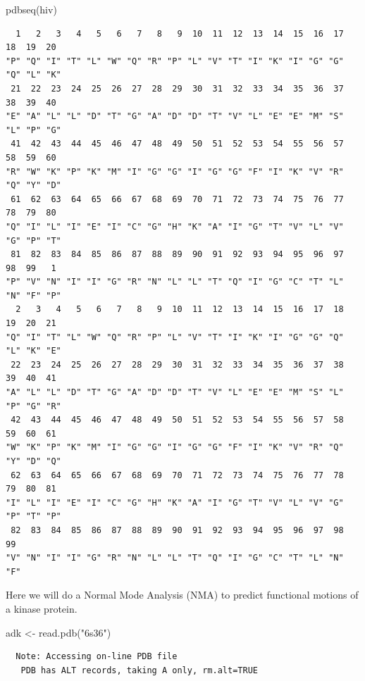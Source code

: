 \documentclass[
  letterpaper,
  DIV=11,
  numbers=noendperiod]{scrartcl}
\newenvironment{Shaded}{\begin{snugshade}}{\end{snugshade}}
\newcommand{\FunctionTok}[1]{\textcolor[rgb]{0.28,0.35,0.67}{#1}}
\newcommand{\NormalTok}[1]{\textcolor[rgb]{0.00,0.23,0.31}{#1}}
\newcommand{\OtherTok}[1]{\textcolor[rgb]{0.00,0.23,0.31}{#1}}
\newcommand{\StringTok}[1]{\textcolor[rgb]{0.13,0.47,0.30}{#1}}
\begin{document}
\begin{Shaded}
\begin{Highlighting}[]
\FunctionTok{pdbseq}\NormalTok{(hiv)}
\end{Highlighting}
\end{Shaded}

\begin{verbatim}
  1   2   3   4   5   6   7   8   9  10  11  12  13  14  15  16  17  18  19  20 
"P" "Q" "I" "T" "L" "W" "Q" "R" "P" "L" "V" "T" "I" "K" "I" "G" "G" "Q" "L" "K" 
 21  22  23  24  25  26  27  28  29  30  31  32  33  34  35  36  37  38  39  40 
"E" "A" "L" "L" "D" "T" "G" "A" "D" "D" "T" "V" "L" "E" "E" "M" "S" "L" "P" "G" 
 41  42  43  44  45  46  47  48  49  50  51  52  53  54  55  56  57  58  59  60 
"R" "W" "K" "P" "K" "M" "I" "G" "G" "I" "G" "G" "F" "I" "K" "V" "R" "Q" "Y" "D" 
 61  62  63  64  65  66  67  68  69  70  71  72  73  74  75  76  77  78  79  80 
"Q" "I" "L" "I" "E" "I" "C" "G" "H" "K" "A" "I" "G" "T" "V" "L" "V" "G" "P" "T" 
 81  82  83  84  85  86  87  88  89  90  91  92  93  94  95  96  97  98  99   1 
"P" "V" "N" "I" "I" "G" "R" "N" "L" "L" "T" "Q" "I" "G" "C" "T" "L" "N" "F" "P" 
  2   3   4   5   6   7   8   9  10  11  12  13  14  15  16  17  18  19  20  21 
"Q" "I" "T" "L" "W" "Q" "R" "P" "L" "V" "T" "I" "K" "I" "G" "G" "Q" "L" "K" "E" 
 22  23  24  25  26  27  28  29  30  31  32  33  34  35  36  37  38  39  40  41 
"A" "L" "L" "D" "T" "G" "A" "D" "D" "T" "V" "L" "E" "E" "M" "S" "L" "P" "G" "R" 
 42  43  44  45  46  47  48  49  50  51  52  53  54  55  56  57  58  59  60  61 
"W" "K" "P" "K" "M" "I" "G" "G" "I" "G" "G" "F" "I" "K" "V" "R" "Q" "Y" "D" "Q" 
 62  63  64  65  66  67  68  69  70  71  72  73  74  75  76  77  78  79  80  81 
"I" "L" "I" "E" "I" "C" "G" "H" "K" "A" "I" "G" "T" "V" "L" "V" "G" "P" "T" "P" 
 82  83  84  85  86  87  88  89  90  91  92  93  94  95  96  97  98  99 
"V" "N" "I" "I" "G" "R" "N" "L" "L" "T" "Q" "I" "G" "C" "T" "L" "N" "F" 
\end{verbatim}

Here we will do a Normal Mode Analysis (NMA) to predict functional
motions of a kinase protein.

\begin{Shaded}
\begin{Highlighting}[]
\NormalTok{adk }\OtherTok{\textless{}{-}} \FunctionTok{read.pdb}\NormalTok{(}\StringTok{"6s36"}\NormalTok{)}
\end{Highlighting}
\end{Shaded}

\begin{verbatim}
  Note: Accessing on-line PDB file
   PDB has ALT records, taking A only, rm.alt=TRUE
\end{verbatim}
\end{document}
